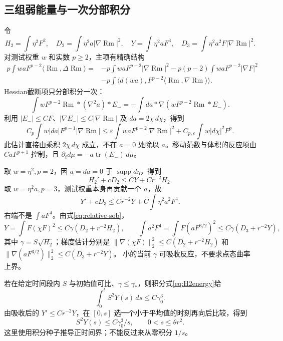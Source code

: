 \documentclass[UTF8,a4paper,11pt,fontset=fandol]{ctexart}
\numberwithin{equation}{section}
\theoremstyle{definition}
\newcommand{\Rm}{\operatorname{Rm}}
\newcommand{\tr}{\operatorname{tr}}
\begin{document}
\subsection{三组弱能量与一次分部积分}
令
\[
H_2=\int\eta^2F^2,\quad D_2=\int\eta^2a|\nabla\Rm|^2,\quad
Y=\int\eta^2aF^3,\quad D_3=\int\eta^2a^2F|\nabla\Rm|^2.
\]
对测试权重 $w$ 和实数 $p\ge2$，主项有精确结构
\begin{align*}
p\int waF^{p-2}\langle\Rm,\Delta\Rm\rangle
={}&-p\int waF^{p-2}|\nabla\Rm|^2
-p(p-2)\int waF^{p-2}|\nabla F|^2\\
&-p\int\langle d(wa),F^{p-2}\langle\Rm,\nabla\Rm\rangle\rangle.
\end{align*}
Hessian截断项只分部积分一次：
\[
\int wF^{p-2}\Rm*(\nabla^2a)*E_-
=-\int da*\nabla(wF^{p-2}\Rm*E_-).
\]
利用 $|E_-|\le CF$、$|\nabla E_-|\le C|\nabla\Rm|$ 及
$da=2\chi\,d\chi$，得到
\[
C_p\int w|da|F^{p-1}|\nabla\Rm|
\le\varepsilon\int waF^{p-2}|\nabla\Rm|^2
+C_{p,\varepsilon}\int w|d\chi|^2F^p.
\]
此估计直接由乘积 $2\chi\,d\chi$ 成立，不在 $a=0$ 处除以 $a$。移动范数与体积的反应项由 $CaF^{p+1}$ 控制，且
$\partial_t d\mu=-a\tr(E_-)\,d\mu$。

取 $w=\eta^2,p=2$，因 $a=da=0$ 于 $\operatorname{supp}d\eta$，得到
\begin{equation}\label{eq:H2energy}
H_2'+cD_2\le CY+Cr^{-2}H_2.
\end{equation}
取 $w=\eta^2a,p=3$，测试权重本身再贡献一个 $a$，故
\begin{equation}\label{eq:H3energy}
Y'+cD_3\le Cr^{-2}Y+C\int\eta^2a^2F^4.
\end{equation}
右端不是 $\int aF^4$。由式\eqref{eq:relative-sob}，
\[
Y=\int F(\chi F)^2
\le C\gamma(D_2+r^{-2}H_2),\qquad
\int a^2F^4=\int F(aF^{3/2})^2
\le C\gamma(D_3+r^{-2}Y),
\]
其中 $\gamma=S\sqrt{H_2}$；梯度估计分别是
$\|\nabla(\chi F)\|_2^2\le C(D_2+r^{-2}H_2)$ 和
$\|\nabla(aF^{3/2})\|_2^2\le C(D_3+r^{-2}Y)$。
小的当前 $\gamma$ 可吸收反应，不要求点态曲率上界。

若在给定时间段内 $S$ 与初始值可比、$\gamma\le\gamma_*$，则积分式\eqref{eq:H2energy}给
\[
\int_0^tS^2Y(s)\,ds\le C\gamma_0^3.
\]
由吸收后的 $Y'\le Cr^{-2}Y$，在 $[0,s]$ 选一个小于平均值的时刻再向后比较，得到
\begin{equation}\label{eq:positive-seed}
S^2Y(s)\le C\gamma_0^3/s,\qquad 0<s\le\theta r^2.
\end{equation}
这里使用积分种子推导正时间界；不能反过来从零积分 $1/s$。
\end{document}
